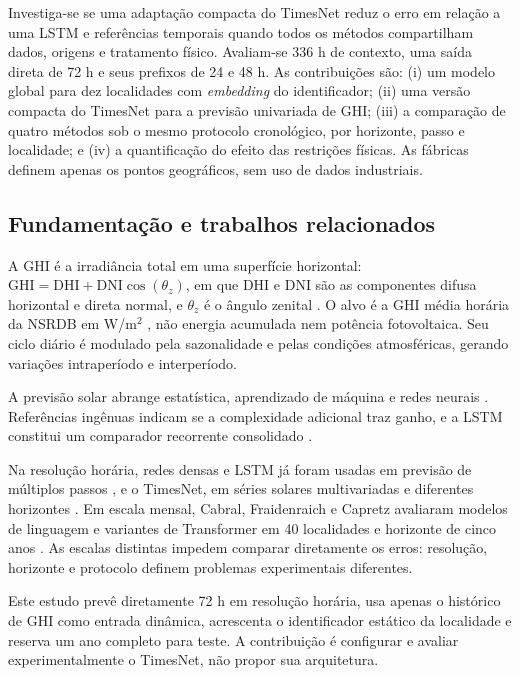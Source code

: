 \documentclass[10pt,conference,a4paper]{IEEEtran}
\begin{document}
Investiga-se se uma adaptação compacta do TimesNet reduz o erro em relação a
uma LSTM e referências temporais quando todos os métodos compartilham dados,
origens e tratamento físico. Avaliam-se 336 h de contexto, uma saída direta de
72 h e seus prefixos de 24 e 48 h. As contribuições são: (i) um modelo global
para dez localidades com \textit{embedding} do identificador; (ii) uma
versão compacta do TimesNet para a previsão univariada de GHI; (iii) a comparação
de quatro métodos sob o mesmo protocolo cronológico, por horizonte, passo e
localidade; e (iv) a quantificação do efeito das restrições físicas. As
fábricas definem apenas os pontos geográficos, sem uso de dados industriais.

\subsection{Fundamentação e trabalhos relacionados}
\label{sec:fundamentacao}

A GHI é a irradiância total em uma superfície horizontal:
$\mathrm{GHI}=\mathrm{DHI}+\mathrm{DNI}\cos(\theta_z)$, em que DHI e DNI são
as componentes difusa horizontal e direta normal, e $\theta_z$ é o ângulo
zenital \cite{duffie2013}. O alvo é a GHI média horária da NSRDB em W/m$^2$
\cite{sengupta2018}, não energia acumulada nem potência fotovoltaica. Seu ciclo
diário é modulado pela sazonalidade e pelas condições atmosféricas, gerando
variações intraperíodo e interperíodo.

A previsão solar abrange estatística, aprendizado de máquina e redes neurais
\cite{voyant2017,voyant2022}. Referências ingênuas indicam se a complexidade
adicional traz ganho, e a LSTM constitui um comparador recorrente consolidado
\cite{hochreiter1997}.

Na resolução horária, redes densas e LSTM já foram usadas em previsão de
múltiplos passos \cite{guariso2020}, e o TimesNet, em séries solares
multivariadas e diferentes horizontes \cite{zhu2024}. Em escala mensal,
Cabral, Fraidenraich e Capretz avaliaram modelos de linguagem e variantes de
Transformer em 40 localidades e horizonte de cinco anos \cite{cabral2026}.
As escalas distintas impedem comparar diretamente os erros: resolução,
horizonte e protocolo definem problemas experimentais diferentes.

Este estudo prevê diretamente 72 h em resolução horária, usa apenas o
histórico de GHI como entrada dinâmica, acrescenta o identificador estático da
localidade e reserva um ano completo para teste. A contribuição é configurar
e avaliar experimentalmente o TimesNet, não propor sua arquitetura.
\end{document}
